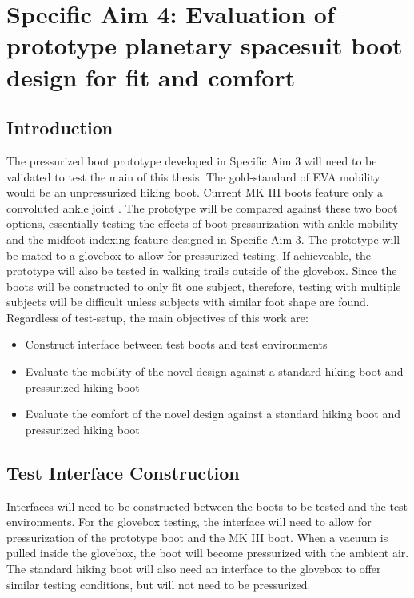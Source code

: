 \documentclass[defaultstyle,11pt]{comps}
\begin{document}
\hypertarget{specific-aim-4-evaluation-of-prototype-planetary-spacesuit-boot-design-for-fit-and-comfort}{%
\chapter{Specific Aim 4: Evaluation of prototype planetary spacesuit boot design for fit and comfort}\label{specific-aim-4-evaluation-of-prototype-planetary-spacesuit-boot-design-for-fit-and-comfort}}

\hypertarget{introduction-3}{%
\section{Introduction}\label{introduction-3}}

The pressurized boot prototype developed in Specific Aim 3 will need to be validated to test the main of this thesis.
The gold-standard of EVA mobility would be an unpressurized hiking boot.
Current MK III boots feature only a convoluted ankle joint \citep{Ross2002}.
The prototype will be compared against these two boot options, essentially testing the effects of boot pressurization with ankle mobility and the midfoot indexing feature designed in Specific Aim 3.
The prototype will be mated to a glovebox to allow for pressurized testing.
If achieveable, the prototype will also be tested in walking trails outside of the glovebox.
Since the boots will be constructed to only fit one subject, therefore, testing with multiple subjects will be difficult unless subjects with similar foot shape are found.
Regardless of test-setup, the main objectives of this work are:

\begin{itemize}
\item
  Construct interface between test boots and test environments
\item
  Evaluate the mobility of the novel design against a standard hiking boot and pressurized hiking boot
\item
  Evaluate the comfort of the novel design against a standard hiking boot and pressurized hiking boot
\end{itemize}

\hypertarget{test-interface-construction}{%
\section{Test Interface Construction}\label{test-interface-construction}}

Interfaces will need to be constructed between the boots to be tested and the test environments.
For the glovebox testing, the interface will need to allow for pressurization of the prototype boot and the MK III boot.
When a vacuum is pulled inside the glovebox, the boot will become pressurized with the ambient air.
The standard hiking boot will also need an interface to the glovebox to offer similar testing conditions, but will not need to be pressurized.
\end{document}
